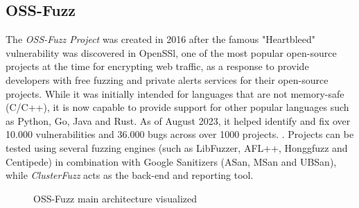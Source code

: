 \subsection{OSS-Fuzz}
The \textit{OSS-Fuzz Project} was created in 2016 after the famous "Heartbleed" vulnerability was discovered in OpenSSl, one of the most popular open-source projects at the time for encrypting web traffic, as a response to provide developers with free fuzzing and private alerts services for their open-source projects.
While it was initially intended for languages that are not memory-safe (C/C++), it is now capable to provide support for other popular languages such as Python, Go, Java and Rust.  
\newline
As of August 2023, it helped identify and fix over 10.000 vulnerabilities and 36.000 bugs across over 1000 projects. \cite{ossfuzz_docs}.
\newline \newline
Projects can be tested using several fuzzing engines (such as LibFuzzer, AFL++, Honggfuzz and Centipede) in combination with Google Sanitizers (ASan, MSan and UBSan), while \textit{ClusterFuzz} acts as the back-end and reporting tool.
\newline \newline
\begin{figure}[h]
\caption{OSS-Fuzz main architecture visualized \cite{ossfuzz_docs}}
\label{fig:ossfuzz_architecture}
\end{figure}


